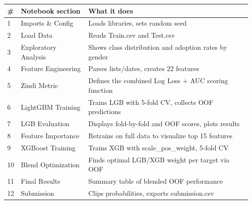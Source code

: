 \documentclass[11pt, a4paper]{article}
\begin{document}
\begin{center}
\small
\begin{tabular}{p{0.5cm} p{3.8cm} p{9cm}}
\toprule
\textbf{\#} & \textbf{Notebook section} & \textbf{What it does} \\
\midrule
1 & Imports \& Config       & Loads libraries, sets random seed \\
2 & Load Data               & Reads Train.csv and Test.csv \\
3 & Exploratory Analysis    & Shows class distribution and adoption rates by gender \\
4 & Feature Engineering     & Parses lists/dates, creates 22 features \\
5 & Zindi Metric            & Defines the combined Log Loss + AUC scoring function \\
6 & LightGBM Training       & Trains LGB with 5-fold CV, collects OOF predictions \\
7 & LGB Evaluation          & Displays fold-by-fold and OOF scores, plots results \\
8 & Feature Importance      & Retrains on full data to visualize top 15 features \\
9 & XGBoost Training        & Trains XGB with scale\_pos\_weight, 5-fold CV \\
10 & Blend Optimization     & Finds optimal LGB/XGB weight per target via OOF \\
11 & Final Results           & Summary table of blended OOF performance \\
12 & Submission              & Clips probabilities, exports submission.csv \\
\bottomrule
\end{tabular}
\end{center}
\end{document}
